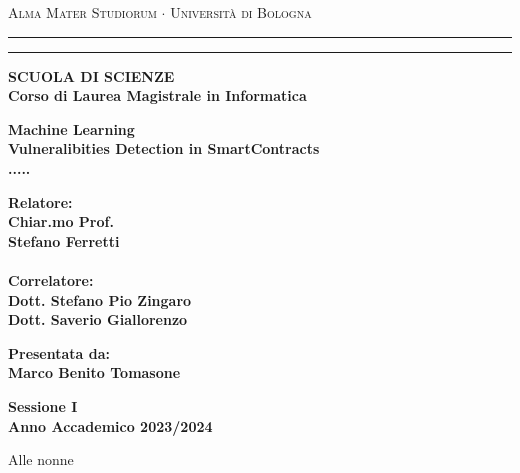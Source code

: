 \documentclass[12pt,a4paper]{report}
\newenvironment{dedication}
{%
\thispagestyle{empty}%
\vspace*{\stretch{1}}%
\itshape             %
\raggedleft          %
}
{\par %
\vspace{\stretch{3}} %
\clearpage           %
}
\begin{document}
\begin{titlepage}
    \begin{center}
    {{\Large{\textsc{Alma Mater Studiorum $\cdot$ Universit\`a di
    Bologna}}}} \rule[0.1cm]{15.8cm}{0.1mm}
    \rule[0.5cm]{15.8cm}{0.6mm}
    {\small{\bf SCUOLA DI SCIENZE\\
    Corso di Laurea Magistrale in Informatica }}
    \end{center}
    \vspace{15mm}
    \begin{center}
    {\LARGE{\bf Machine Learning}}\\
    \vspace{3mm}
    {\LARGE{\bf Vulneralibities Detection in SmartContracts }}\\
    \vspace{3mm}
    {\LARGE{\bf ..... }}\\
    \end{center}
    \vspace{40mm}
    \par
    \noindent
    \begin{minipage}[t]{0.47\textwidth}
    {\large{\bf Relatore:\\
    Chiar.mo Prof.\\
    Stefano Ferretti\\
    \\
    Correlatore:\\
    Dott. Stefano Pio Zingaro\\
    Dott. Saverio Giallorenzo\\
    }}
    \end{minipage}
    \hfill
    \begin{minipage}[t]{0.47\textwidth}\raggedleft
    {\large{\bf Presentata da:\\
    Marco Benito Tomasone}}
    \end{minipage}
    \vspace{20mm}
    \begin{center}
    {\large{\bf Sessione I\\%
    Anno Accademico 2023/2024}}%
    \end{center}
    \end{titlepage}

    \begin{dedication}
        Alle nonne
    \end{dedication}
    \tableofcontents
    \listoffigures
\end{document}
